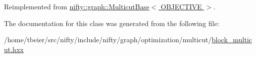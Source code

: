 Reimplemented from \hyperlink{classnifty_1_1graph_1_1MulticutBase_a4c7a44afdc661993b3252dba62b5386f}{nifty\+::graph\+::\+Multicut\+Base$<$ O\+B\+J\+E\+C\+T\+I\+V\+E $>$}.



The documentation for this class was generated from the following file\+:\begin{DoxyCompactItemize}
\item 
/home/tbeier/src/nifty/include/nifty/graph/optimization/multicut/\hyperlink{block__multicut_8hxx}{block\+\_\+multicut.\+hxx}\end{DoxyCompactItemize}
